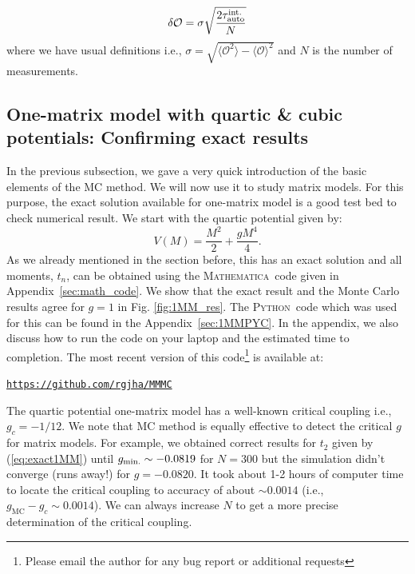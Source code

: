 \documentclass[letter,11pt]{article}
\newcommand{\MA}{\textsc{Mathematica}}
\newcommand{\PY}{\textsc{Python}}
\begin{document}
\begin{equation}
	\delta \mathcal{O} = \sigma \sqrt{\frac{2 \tau_{\rm{auto}}^{\rm{int.}}}{N}}  %
\end{equation}
where we have usual definitions i.e., 
$\sigma = \sqrt{\langle \mathcal{O}^2\rangle - \langle \mathcal{O}\rangle^{2}}$ and $N$ is the number of measurements. 

\subsection{One-matrix model with quartic \& cubic potentials: Confirming exact results} 
In the previous subsection, we gave a very quick introduction of the basic elements of the MC method. We will now use it to study matrix models. For this purpose, the exact solution available for one-matrix model is a good test bed to check numerical result. We start with the quartic potential given by:
\begin{equation}
	V(M) = \frac{M^2}{2} + \frac{gM^4}{4}.  
\end{equation}
As we already mentioned in the section before, this has an exact solution and all moments, $t_{n}$, 
can be obtained using the \MA~code given in  Appendix~\ref{sec:math_code}. We show that the exact result and the Monte Carlo results agree for $g=1$ in Fig. \ref{fig:1MM_res}. The \PY~code which was used for this 
can be found in the Appendix~\ref{sec:1MMPYC}. In the appendix, we also 
discuss how to run the code on your laptop and the estimated time to completion. The most recent version of this 
code\footnote{Please email the author for any bug report or additional requests} is available at:
\begin{center} \texttt{\href{https://github.com/rgjha/MMMC}{https://github.com/rgjha/MMMC}} \end{center} 
The quartic potential one-matrix model has a well-known critical coupling i.e., $ g_{c} = -1/12$. 
We note that MC method is equally effective to detect the critical $g$ for matrix models. 
For example, we obtained correct results for $t_{2}$ given by (\ref{eq:exact1MM}) 
until $g_{\rm{min.}} \sim -0.0819$ for $N=300$ but the simulation didn't converge (runs away!) 
for $g = -0.0820$. It took about 1-2 hours of computer time to 
locate the critical coupling to accuracy of about 
$\sim 0.0014$ (i.e., $g_{\text{MC}} - g_{c} \sim 0.0014$). We can always increase $N$ to get a more precise determination of the critical coupling. 
\end{document}
